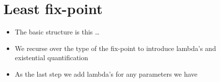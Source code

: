 \documentclass[thesis.tex]{subfiles}
\begin{document}
    \section{Least fix-point}
    \begin{itemize}
        \item The basic structure is this \dots
        \item We recurse over the type of the fix-point to introduce lambda's and existential quantification
        \item As the last step we add lambda's for any parameters we have
    \end{itemize}
\end{document}
